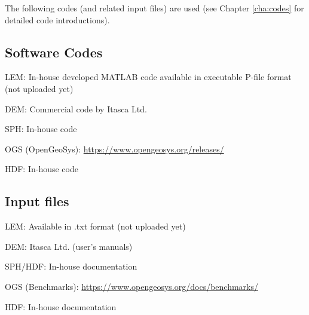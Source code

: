 The following codes (and related input files) are used (see Chapter \ref{cha:codes} for detailed code introductions).

\subsection*{Software Codes}
\begin{list}{-}{\leftmargin=1em \itemindent=0em \itemsep=0em}
\item LEM: In-house developed MATLAB code available in executable P-file format (not uploaded yet)
\item DEM: Commercial code by Itasca Ltd.
\item SPH: In-house code
\item OGS (OpenGeoSys): \url{https://www.opengeosys.org/releases/}
\item HDF: In-house code
\end{list}

\subsection*{Input files}
\begin{list}{-}{\leftmargin=1em \itemindent=0em \itemsep=0em}
\item LEM: Available in .txt format (not uploaded yet)
\item DEM: Itasca Ltd. (user's manuals)
\item SPH/HDF: In-house documentation
\item OGS (Benchmarks): \url{https://www.opengeosys.org/docs/benchmarks/}
\item HDF: In-house documentation
\end{list}

